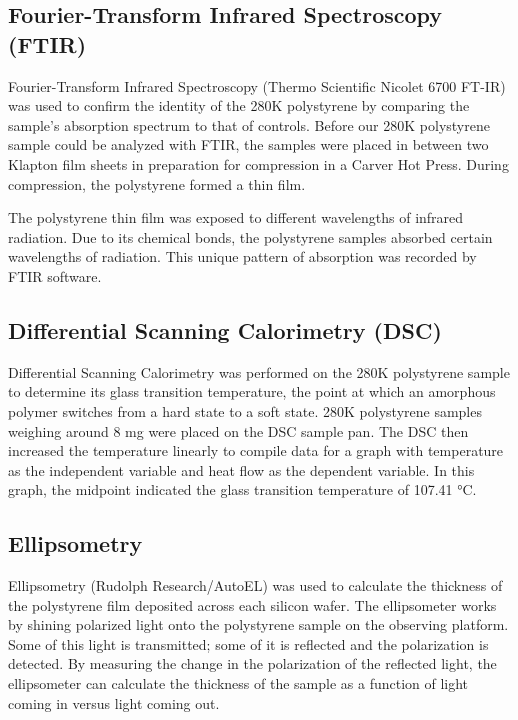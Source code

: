 \documentclass{article}
\begin{document}
\begin{multicols}{2}
            \subsection{Fourier-Transform Infrared Spectroscopy (FTIR)}
                Fourier-Transform Infrared Spectroscopy (Thermo Scientific Nicolet 6700 FT-IR) was used to confirm the identity of the 280K polystyrene by comparing the sample’s absorption spectrum to that of controls. Before our 280K polystyrene sample could be analyzed with FTIR, the samples were placed in between two Klapton film sheets in preparation for compression in a Carver Hot Press. During compression, the polystyrene formed a thin film. 

                The polystyrene thin film was exposed to different wavelengths of infrared radiation. Due to its chemical bonds, the polystyrene samples absorbed certain wavelengths of radiation. This unique pattern of absorption was recorded by FTIR software.

            \subsection{Differential Scanning Calorimetry (DSC)}
                Differential Scanning Calorimetry was performed on the 280K polystyrene sample to determine its glass transition temperature, the point at which an amorphous polymer switches from a hard state to a soft state. 280K polystyrene samples weighing around 8 mg were placed on the DSC sample pan. The DSC then increased the temperature linearly to compile data for a graph with temperature as the independent variable and heat flow as the dependent variable. In this graph, the midpoint indicated the glass transition temperature of 107.41 °C.

            \subsection{Ellipsometry}
                Ellipsometry (Rudolph Research/AutoEL) was used to calculate the thickness of the polystyrene film deposited across each silicon wafer. The ellipsometer works by shining polarized light onto the polystyrene sample on the observing platform. Some of this light is transmitted; some of it is reflected and the polarization is detected. By measuring the change in the polarization of the reflected light, the ellipsometer can calculate the thickness of the sample as a function of light coming in versus light coming out.


\end{multicols}
\end{document}
